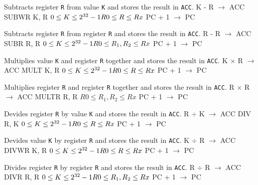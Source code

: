 \documentclass[titlepage]{scrartcl}
\begin{document}
{Subtracts register \texttt{R} from value \texttt{K} and stores the result in \texttt{ACC}.}
{K - R $\rightarrow$ ACC}
{SUBWR K, R}
{$0 \leq K \leq 2^{32} - 1 \hfill \break R0 \leq R \leq Rx$}
{PC + 1 $\rightarrow$ PC}
{}
{}

{Subtracts register \texttt{R} from register \texttt{R} and stores the result in \texttt{ACC}.}
{R - R $\rightarrow$ ACC}
{SUBR R, R}
{$0 \leq K \leq 2^{32} - 1 \hfill \break R0 \leq R_{1}, R_{2} \leq Rx$}
{PC + 1 $\rightarrow$ PC}
{}
{}

{Multiplies value \texttt{K} and register \texttt{R} together and stores the result in \texttt{ACC}.}
{K $\times$ R $\rightarrow$ ACC}
{MULT K, R}
{$0 \leq K \leq 2^{32} - 1 \hfill \break R0 \leq R \leq Rx$}
{PC + 1 $\rightarrow$ PC}
{}
{}

{Multiplies register \texttt{R} and register \texttt{R} together and stores the result in \texttt{ACC}.}
{R $\times$ R $\rightarrow$ ACC}
{MULTR R, R}
{$R0 \leq R_{1}, R_{2} \leq Rx$}
{PC + 1 $\rightarrow$ PC}
{}
{}

{Devides register \texttt{R} by value \texttt{K} and stores the result in \texttt{ACC}.}
{R $\div$ K $\rightarrow$ ACC}
{DIV R, K}
{$0 \leq K \leq 2^{32} - 1 \hfill \break R0 \leq R \leq Rx$}
{PC + 1 $\rightarrow$ PC}
{}
{}

{Devides value \texttt{K} by register \texttt{R} and stores the result in \texttt{ACC}.}
{K $\div$  R $\rightarrow$ ACC}
{DIVWR K, R}
{$0 \leq K \leq 2^{32} - 1 \hfill \break R0 \leq R \leq Rx$}
{PC + 1 $\rightarrow$ PC}
{}
{}

{Divides register \texttt{R} by register \texttt{R} and stores the result in \texttt{ACC}.}
{R $\div$ R $\rightarrow$ ACC}
{DIVR R, R}
{$0 \leq K \leq 2^{32} - 1 \hfill \break R0 \leq R_{1}, R_{2} \leq Rx$}
{PC + 1 $\rightarrow$ PC}
{}
{}

\end{document}
